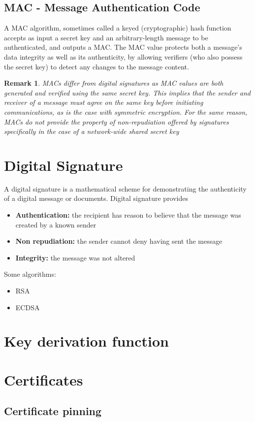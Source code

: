\documentclass[10pt,a4paper]{article}
\newtheorem{remark}{Remark}
\begin{document}
\subsection{MAC - Message Authentication Code}
A MAC algorithm, sometimes called a keyed (cryptographic) hash function accepts as input a secret key and an arbitrary-length message to be authenticated, and outputs a MAC. The MAC value protects both a message's data integrity as well as its authenticity, by allowing verifiers (who also possess the secret key) to detect any changes to the message content.
\begin{remark}
MACs differ from digital signatures as MAC values are both generated and verified using the same secret key. This implies that the sender and receiver of a message must agree on the same key before initiating communications, as is the case with symmetric encryption. For the same reason, MACs do not provide the property of non-repudiation offered by signatures specifically in the case of a network-wide shared secret key
\end{remark}
\section{Digital Signature}
A digital signature is a mathematical scheme for demonstrating the authenticity of a digital message or documents. Digital signature provides
\begin{itemize}
\item {\bf Authentication:} the recipient has reason to believe that the message was created by a known sender
\item {\bf Non repudiation:} the sender cannot deny having sent the message
\item {\bf Integrity:} the message was not altered
\end{itemize}
Some algorithms:
\begin{itemize}
\item RSA
\item ECDSA
\end{itemize}
\section{Key derivation function}
\section{Certificates}
\subsection{Certificate pinning}
\end{document}
